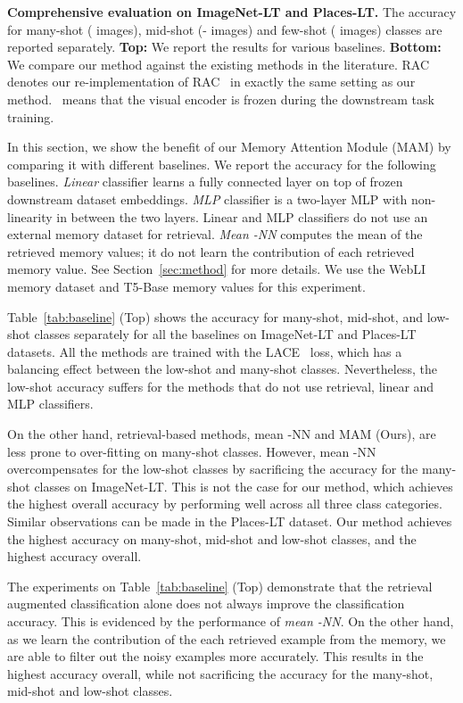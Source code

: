 \begin{table*}
 \caption{\textbf{Comprehensive evaluation on ImageNet-LT and Places-LT.} The accuracy for many-shot ( images), mid-shot (- images) and few-shot ( images) classes are reported separately. \textbf{Top:} We report the results for various baselines. \textbf{Bottom: } We compare our method against the existing methods in the literature. RAC denotes our re-implementation of RAC~\cite{long2022retrieval} in exactly the same setting as our method. \faLock ~means that the visual encoder is frozen during the downstream task training.
  \label{tab:baseline}}
\end{table*}

In this section, we show the benefit of our Memory Attention Module (MAM) by comparing it with different baselines. 
We report the accuracy for the following baselines.
\emph{Linear} classifier learns a fully connected layer on top of frozen downstream dataset embeddings.
\emph{MLP} classifier is a two-layer MLP with non-linearity in between the two layers.
Linear and MLP classifiers do not use an external memory dataset for retrieval. 
\emph{Mean -NN} computes the mean of the retrieved memory values; it do not learn the contribution of each retrieved memory value.
See Section~\ref{sec:method} for more details.
We use the WebLI memory dataset and T5-Base memory values for this experiment.

Table~\ref{tab:baseline} (Top) shows the accuracy for many-shot, mid-shot, and low-shot classes separately for all the baselines on ImageNet-LT and Places-LT datasets.
All the methods are trained with the LACE~\cite{menon2021longtail} loss, which has a balancing effect between the low-shot and many-shot classes.
Nevertheless, the low-shot accuracy suffers for the methods that do not use retrieval, \eg linear and MLP classifiers.

On the other hand, retrieval-based methods, \eg mean -NN and MAM (Ours), are less prone to over-fitting on many-shot classes.
However, mean -NN overcompensates for the low-shot classes by sacrificing the accuracy for the many-shot classes on ImageNet-LT.
This is not the case for our method, which achieves the highest overall accuracy by performing well across all three class categories.
Similar observations can be made in the Places-LT dataset. 
Our method achieves the highest accuracy on many-shot, mid-shot and low-shot classes, and the highest accuracy overall.

The experiments on Table~\ref{tab:baseline} (Top) demonstrate that the retrieval augmented classification alone does not always improve the classification accuracy.
This is evidenced by the performance of \emph{mean -NN}.
On the other hand, as we learn the contribution of the each retrieved example from the memory, we are able to filter out the noisy examples more accurately.
This results in the highest accuracy overall, while not sacrificing the accuracy for the many-shot, mid-shot and low-shot classes.

